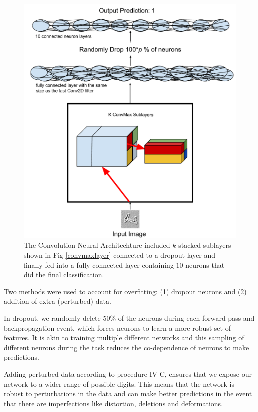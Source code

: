 \documentclass[conference]{IEEEtran}
\begin{document}
\begin{figure}[h]
	\includegraphics[scale=0.5]{architecture.pdf}
	\caption{The Convolution Neural Architechture included $k$ stacked sublayers shown in Fig \ref{convmaxlayer} connected to a dropout layer and finally fed into a fully connected layer containing $10$ neurons that did the final classification.}
	\label{CNNarch}
\end{figure}

Two methods were used to account for overfitting: (1) dropout\cite{dropout} neurons and (2) addition of extra (perturbed) data. 

In dropout, we randomly delete $50\%$ of the neurons during each forward pass and backpropagation event, which forces neurons to learn a more robust set of features. It is akin to training multiple different networks and this sampling of different neurons during the task reduces the co-dependence of neurons to make predictions. 

Adding perturbed data according to procedure IV-C, ensures that we expose our network to a wider range of possible digits. This means that the network is robust to perturbations in the data and can make better predictions in the event that there are imperfections like distortion, deletions and deformations.
\end{document}
